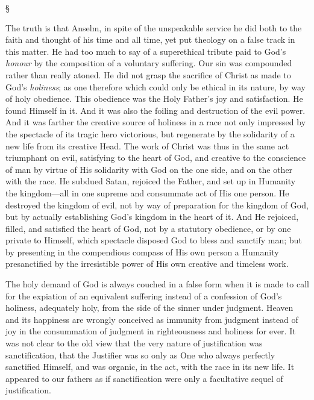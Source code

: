 \documentclass[12pt,a5paper,twoside,titlepage]{book}
\begin{document}
\begin{center}
\S
\end{center}

The truth is that Anselm, in spite of the 
unspeakable service he did both to the faith 
and thought of his time and all time, yet put 
theology on a false track in this matter. He 
had too much to say of a superethical tribute 
paid to God's \textit{honour} by the composition of a 
voluntary suffering. Our sin was compounded 
rather than really atoned. He did not grasp the 
sacrifice of Christ as made to God's \textit{holiness}; as 
one therefore which could only be ethical in its 
nature, by way of holy obedience. This obedience 
was the Holy Father's joy and satisfaction. He 
found Himself in it. And it was also the foiling 
and destruction of the evil power. And it was 
farther the creative source of holiness in a race 
not only impressed by the spectacle of its tragic 
hero victorious, but regenerate by the solidarity 
of a new life from its creative Head. The work 
of Christ was thus in the same act triumphant 
on evil, satisfying to the heart of God, and 
creative to the conscience of man by virtue of 
His solidarity with God on the one side, and on 
the other with the race. He subdued Satan, 
rejoiced the Father, and set up in Humanity the 
kingdom---all in one supreme and consummate 
act of His one person. He destroyed the kingdom 
of evil, not by way of preparation for the 
kingdom of God, but by actually establishing 
God's kingdom in the heart of it. And He rejoiced, 
filled, and satisfied the heart of God, not 
by a statutory obedience, or by one private to 
Himself, which spectacle disposed God to bless 
and sanctify man; but by presenting in the 
compendious compass of His own person a 
Humanity presanctified by the irresistible 
power of His own creative and timeless work. 

The holy demand of God is always couched in 
a false form when it is made to call for the 
expiation of an equivalent suffering instead of a 
confession of God's holiness, adequately holy, 
from the side of the sinner under judgment. 
Heaven and its happiness are wrongly conceived 
as immunity from judgment instead of joy in 
the consummation of judgment in righteousness 
and holiness for ever. It was not clear to the 
old view that the very nature of justification 
was sanctification, that the Justifier was so only 
as One who always perfectly sanctified Himself, 
and was organic, in the act, with the race in its 
new life. It appeared to our fathers as if sanctification 
were only a facultative sequel of justification. 
\end{document}
